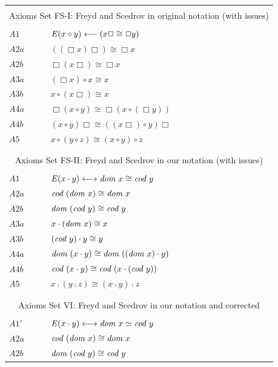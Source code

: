 \begin{table} \centering \normalsize
\begin{tabular}{ll}
\hline
\\
\multicolumn{2}{c}{Axioms Set FS-I:  Freyd and Scedrov in original notation (with issues)} \\
\\
  $A1$ &  $\mathit{E}(x \circ y) \longleftarrow (x\Box \cong \Box y)$ \\ 
  $A2a$ & $((\Box x)\Box) \cong \Box x$ \\ 
  $A2b$ & $\Box (x\Box) \cong \Box x$ \\ 
  $A3a$ & $(\Box x) \circ x \cong x$ \\ 
  $A3b$ & $x \circ (x\Box) \cong x$ \\ 
  $A4a$ & $\Box(x \circ y) \cong \Box(x \circ (\Box y))$ \\ 
  $A4b$ & $(x \circ y)\Box \cong ((x\Box) \circ y)\Box$ \\ 
  $A5$   & $x \circ (y \circ z) \cong  (x \circ y) \circ z$ \\
\\
\hline
\\
\multicolumn{2}{c}{Axioms Set FS-II: Freyd and Scedrov in our notation (with issues)} \\
\\
  $A1$  & $\mathit{E} (x \cdot y) \longleftrightarrow \textit{dom \/} x \cong \textit{cod \/} y$ \\
  $A2a$ & $\textit{cod \/}(\textit{dom \/} x) \cong \textit{dom \/} x$ \\  
  $A2b$ & $\textit{dom \/}(\textit{cod \/} y) \cong \textit{cod \/} y$ \\  
  $A3a$  & $x \cdot (\textit{dom \/} x) \cong x$ \\ 
  $A3b$ & $(\textit{cod \/} y) \cdot y \cong y$ \\
  $A4a$ & $\textit{dom \/}(x \cdot y) \cong \textit{dom \/}((\textit{dom \/} x) \cdot y)$ \\ 
  $A4b$ & $\textit{cod \/}(x \cdot y) \cong \textit{cod \/}(x \cdot (\textit{cod \/} y))$ \\ 
  $A5$   & $x \comp (y \comp z) \cong  (x \comp y) \comp z$   \\
\\
\hline
\\
\multicolumn{2}{c}{Axioms Set VI: Freyd and Scedrov in our notation
  and corrected} \\
\\
  $A1'$  & $\mathit{E} (x \cdot y) \longleftrightarrow \textit{dom \/} x \simeq\textit{cod \/} y$ \\
  $A2a$ & $\textit{cod \/}(\textit{dom \/} x) \cong \textit{dom \/} x$ \\  
  $A2b$ & $\textit{dom \/}(\textit{cod \/} y) \cong \textit{cod \/} y$ \\  

\end{tabular}
\end{table}
